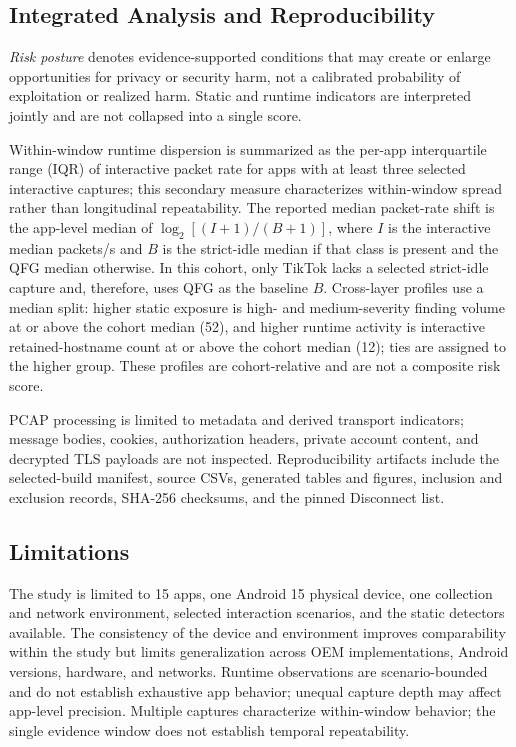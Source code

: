\subsection{Integrated Analysis and Reproducibility}

\emph{Risk posture} denotes evidence-supported conditions that may create or enlarge opportunities for privacy or security harm, not a calibrated probability of exploitation or realized harm. Static and runtime indicators are interpreted jointly and are not collapsed into a single score.

Within-window runtime dispersion is summarized as the per-app interquartile range (IQR) of interactive packet rate for apps with at least three selected interactive captures; this secondary measure characterizes within-window spread rather than longitudinal repeatability. The reported median packet-rate shift is the app-level median of $\log_2[(I+1)/(B+1)]$, where $I$ is the interactive median packets/s and $B$ is the strict-idle median if that class is present and the QFG median otherwise. In this cohort, only TikTok lacks a selected strict-idle capture and, therefore, uses QFG as the baseline $B$. Cross-layer profiles use a median split: higher static exposure is high- and medium-severity finding volume at or above the cohort median (52), and higher runtime activity is interactive retained-hostname count at or above the cohort median (12); ties are assigned to the higher group. These profiles are cohort-relative and are not a composite risk score.

PCAP processing is limited to metadata and derived transport indicators; message bodies, cookies, authorization headers, private account content, and decrypted TLS payloads are not inspected. Reproducibility artifacts include the selected-build manifest, source CSVs, generated tables and figures, inclusion and exclusion records, SHA-256 checksums, and the pinned Disconnect list.

\subsection{Limitations}

The study is limited to 15 apps, one Android 15 physical device, one collection and network environment, selected interaction scenarios, and the static detectors available. The consistency of the device and environment improves comparability within the study but limits generalization across OEM implementations, Android versions, hardware, and networks. Runtime observations are scenario-bounded and do not establish exhaustive app behavior; unequal capture depth may affect app-level precision. Multiple captures characterize within-window behavior; the single evidence window does not establish temporal repeatability.

